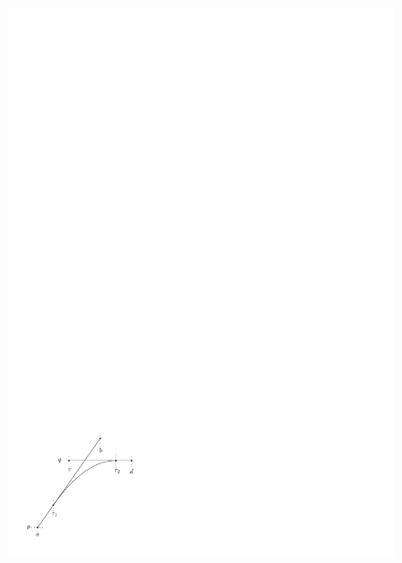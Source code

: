 \documentclass[a4paper]{article}
\theoremstyle{definition}
\theoremstyle{plain}
\begin{document}
\begin{figure}
\centering
\begin{minipage}{.45\textwidth}
  \centering
  \includegraphics[width=0.9\linewidth]{figures/motion/lemma_full_still}
  \label{fig:full_still}
\end{minipage}%
\hspace{1.0em}
\begin{minipage}{.45\textwidth}
  \centering

\end{minipage}
\end{figure}
\end{document}

